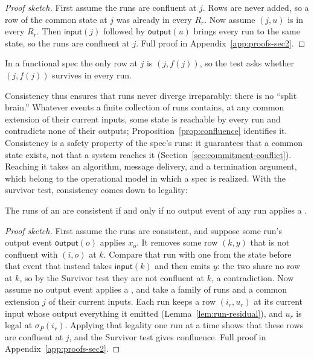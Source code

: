 \begin{proof}[Proof sketch]
First assume the runs are confluent at $j$.  Rows are never added, so a row of
the common state at $j$ was already in every $R_r$.  Now assume $(j,u)$ is in
every $R_r$.  Then $\mathsf{input}(j)$ followed by $\mathsf{output}(u)$ brings
every run to the same state, so the runs are confluent at $j$.  Full proof in
Appendix~\ref{app:proofs-sec2}.
\end{proof}

In a functional spec the only row at $j$ is $(j,f(j))$, so the test
asks whether $(j,f(j))$ survives in every run.

Consistency thus ensures that runs never diverge irreparably: there is no
``split brain.''  Whatever events a finite collection of runs contains, at any common extension of their current inputs, some state is reachable by every run
and contradicts none of their outputs; Proposition~\ref{prop:confluence}
identifies it.  Consistency is a safety property of the spec's runs: it guarantees that a common
state exists, not that a system reaches it
(Section~\ref{sec:commitment-conflict}).  Reaching it takes an algorithm,
message delivery, and a termination argument, which belong to the operational
model in which a spec is realized.  With the survivor test, consistency comes down to legality:

\begin{lemma}
\label{lem:confluence-legality}
The runs of an \spectype are consistent if and only if no output event of any
run applies a \commitment.
\end{lemma}

\begin{proof}[Proof sketch]
First assume the runs are consistent, and suppose some run's output event
$\mathsf{output}(o)$ applies $x_o$.  It removes some row $(k,y)$ that is not confluent with $(i,o)$ at $k$.  Compare that run with one from the state
before that event that instead takes $\mathsf{input}(k)$ and then emits $y$:
the two share no row at $k$, so by the Survivor test they are not confluent at
$k$, a contradiction.  Now assume no output event applies a \commitment, and
take a family of runs and a common extension $j$ of their current inputs.  Each run keeps a row
$(i_r,u_r)$ at its current input whose output \outrel everything it emitted
(Lemma~\ref{lem:run-residual}), and $u_r$ is legal at $\sigma_P(i_r)$.
Applying that legality one run at a time shows that these rows are confluent at $j$, and the Survivor test gives confluence.  Full proof in
Appendix~\ref{app:proofs-sec2}.
\end{proof}


